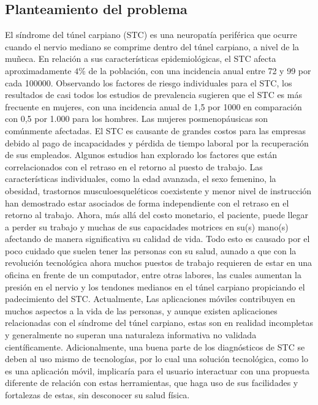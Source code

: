 \documentclass[a4paper,man,natbib]{apa6}
\begin{document}
\subsection{Planteamiento del problema}
El síndrome del túnel carpiano (STC) es una neuropatía periférica que ocurre cuando el nervio mediano se comprime dentro del túnel carpiano, a nivel de la muñeca. En relación a sus características epidemiológicas, el STC afecta aproximadamente $4\%$ de la población, con una incidencia anual entre 72 y 99 por cada 100000. \cite{s1} \cite{s4} Observando los factores de riesgo individuales para el STC, los resultados de casi todos los estudios de prevalencia sugieren que el STC es más frecuente en mujeres, con una incidencia anual de 1,5 por 1000 en comparación con 0,5 por 1.000 para los hombres. \cite{s5}  Las mujeres posmenopáusicas son comúnmente afectadas. \cite{s2}
El STC es causante de grandes costos para las empresas debido al pago de  incapacidades y pérdida de tiempo laboral por la recuperación de sus empleados. Algunos estudios han explorado los factores que están correlacionados con el retraso en el retorno al puesto de trabajo. Las características individuales, como la edad avanzada, el sexo femenino, la obesidad, trastornos musculoesqueléticos coexistente \cite{s6} y menor nivel de instrucción \cite{s7} han demostrado estar asociados de forma independiente con el retraso en el retorno al trabajo. Ahora, más allá del costo monetario, el paciente, puede llegar a perder su trabajo y muchas de sus capacidades motrices en su(s) mano(s) afectando de manera significativa su calidad de vida. Todo esto es causado por el poco cuidado que suelen tener las personas con su salud, aunado a que con la revolución tecnológica ahora muchos puestos de trabajo requieren de estar en una oficina en frente de un computador, entre otras labores, las cuales aumentan la presión en el nervio y los tendones medianos en el túnel carpiano propiciando el padecimiento del STC.
 Actualmente, Las aplicaciones móviles contribuyen en muchos aspectos a la vida de las personas, y aunque existen aplicaciones relacionadas con el síndrome del túnel carpiano, estas son en realidad incompletas y generalmente no superan una naturaleza informativa no validada científicamente. Adicionalmente, una buena parte de los diagnósticos de STC se deben al uso mismo de tecnologías, por lo cual una solución tecnológica, como lo es una aplicación móvil, implicaría para el usuario interactuar con una propuesta diferente de relación con estas herramientas,  que haga uso de sus facilidades y fortalezas de estas, sin desconocer su salud física.
\end{document}
